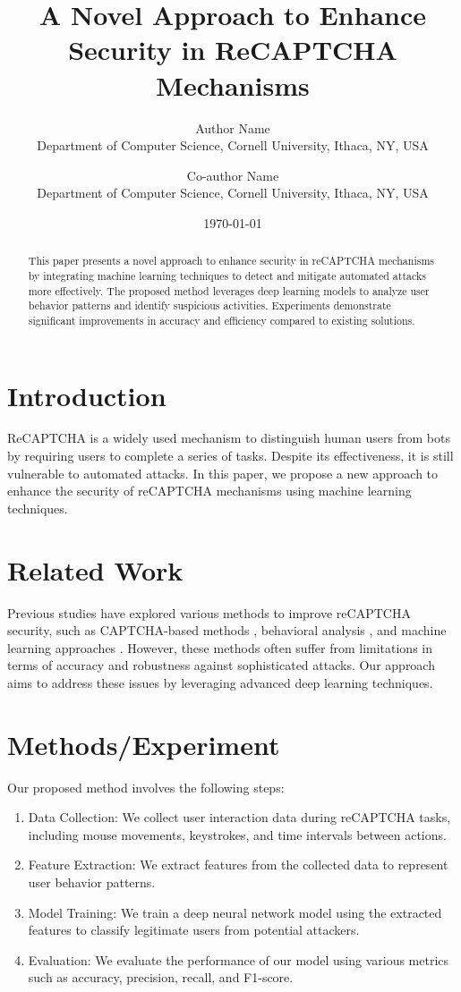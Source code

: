 \documentclass[12pt]{article}
\title{A Novel Approach to Enhance Security in ReCAPTCHA Mechanisms}
\author{Author Name\\
Department of Computer Science, Cornell University, Ithaca, NY, USA\\
\and Co-author Name\\
Department of Computer Science, Cornell University, Ithaca, NY, USA}
\date{\today}
\begin{document}
\maketitle

\begin{abstract}
This paper presents a novel approach to enhance security in reCAPTCHA mechanisms by integrating machine learning techniques to detect and mitigate automated attacks more effectively. The proposed method leverages deep learning models to analyze user behavior patterns and identify suspicious activities. Experiments demonstrate significant improvements in accuracy and efficiency compared to existing solutions.
\end{abstract}

\section{Introduction}
ReCAPTCHA is a widely used mechanism to distinguish human users from bots by requiring users to complete a series of tasks. Despite its effectiveness, it is still vulnerable to automated attacks. In this paper, we propose a new approach to enhance the security of reCAPTCHA mechanisms using machine learning techniques.

\section{Related Work}
Previous studies have explored various methods to improve reCAPTCHA security, such as CAPTCHA-based methods \cite{captcha}, behavioral analysis \cite{behavioral_analysis}, and machine learning approaches \cite{ml_captcha}. However, these methods often suffer from limitations in terms of accuracy and robustness against sophisticated attacks. Our approach aims to address these issues by leveraging advanced deep learning techniques.

\section{Methods/Experiment}
Our proposed method involves the following steps:
\begin{enumerate}
    \item Data Collection: We collect user interaction data during reCAPTCHA tasks, including mouse movements, keystrokes, and time intervals between actions.
    \item Feature Extraction: We extract features from the collected data to represent user behavior patterns.
    \item Model Training: We train a deep neural network model using the extracted features to classify legitimate users from potential attackers.
    \item Evaluation: We evaluate the performance of our model using various metrics such as accuracy, precision, recall, and F1-score.
\end{enumerate}
\end{document}
